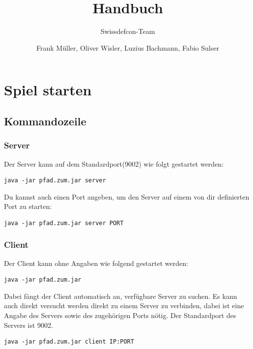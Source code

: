 \documentclass[ngerman, 12pt, pdftex]{scrartcl}[2006/07/30]
\title{Handbuch}
\author{Frank M\"{u}ller, Oliver Wisler, Luzius Bachmann, Fabio Sulser}
\subtitle{Swissdefcon-Team}
\begin{document}
\pagestyle{fancy}
\fancyhf{} 
\fancyhead[R]{\thepage}  %
\renewcommand{\headrulewidth}{0.1pt} 	%



\maketitle


\newpage

\tableofcontents

\newpage

\section{Spiel starten}
\subsection{Kommandozeile}
\subsubsection{Server}
Der Server kann auf dem Standardport(9002) wie folgt gestartet werden:

\begin{lstlisting}
java -jar pfad.zum.jar server
\end{lstlisting}
Du kannst auch einen Port angeben, um den Server auf einem von dir definierten Port zu starten:
\begin{lstlisting}
java -jar pfad.zum.jar server PORT
\end{lstlisting}
           

\subsubsection{Client}
Der Client kann ohne Angaben wie folgend gestartet werden:
\begin{lstlisting}
java -jar pfad.zum.jar
\end{lstlisting}
Dabei fängt der Client automatisch an, verfügbare Server zu suchen. 
Es kann auch direkt versucht werden direkt zu einem Server zu verbinden, 
dabei ist eine Angabe des Servers sowie des zugehörigen Ports nötig.
Der Standardport des Servers ist 9002.
\begin{lstlisting}
java -jar pfad.zum.jar client IP:PORT 
\end{lstlisting}
\end{document}
